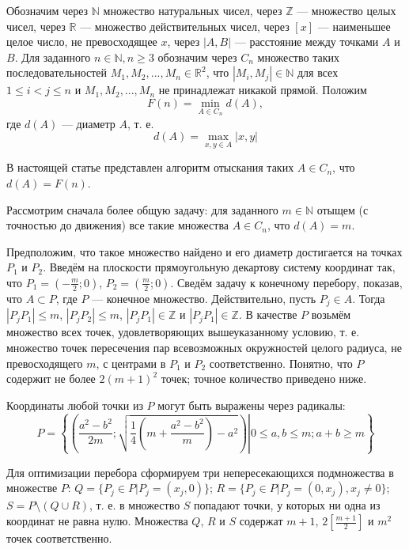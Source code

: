 \documentclass{article}
\begin{document}
Обозначим через $\mathbb{N}$ множество натуральных чисел, через $\mathbb{Z}$ --- множество целых чисел, через $\mathbb{R}$ --- множество действительных чисел, через $[x]$ --- наименьшее целое число, не превосходящее $x$, через $|A,B|$ --- расстояние между точками $A$ и $B$.
Для заданного $n\in \mathbb{N}, n\geq 3$ обозначим через $C_n$ множество таких последовательностей $M_1,M_2,...,M_n \in \mathbb{R}^2$, что $|M_i,M_j|\in\mathbb{N}$ для всех $1\leq i < j  \leq n$ и  $M_1,M_2,...,M_n$ не принадлежат никакой прямой.
Положим
$$
F(n)=\min\limits_{A\in C_n} d(A),
$$
где $d(A)$ --- диаметр $A$, т. е.
$$
d(A)=\max\limits_{x,y\in A}|x,y|
$$

В настоящей статье представлен алгоритм отыскания таких $A \in C_n$, что $d(A) = F(n)$.






Рассмотрим сначала более общую задачу: для заданного $m \in \mathbb{N}$ отыщем (с точностью до движения) все такие множества $A \in C_n$, что $d(A) = m$.

Предположим, что такое множество найдено и его диаметр достигается на точках $P_1$ и $P_2$.
Введём на плоскости прямоугольную декартову систему координат так, что $P_1 = \left(-\frac{m}{2}; 0 \right)$, $P_2 = \left(\frac{m}{2}; 0\right)$.
Сведём задачу к конечному перебору, показав, что $A \subset P$, где $P$ --- конечное множество.
Действительно, пусть $P_{j} \in A$.
Тогда $|P_{j} P_1| \leq m$, $|P_{j} P_2| \leq m$, $|P_{j} P_1| \in \mathbb{Z}$ и $|P_{j} P_1| \in \mathbb{Z}$.
В качестве $P$ возьмём множество всех точек, удовлетворяющих вышеуказанному условию, т. е. множество точек пересечения пар всевозможных окружностей целого радиуса, не превосходящего $m$, с центрами в $P_1$ и $P_2$ соответственно.
Понятно, что $P$ содержит не более $2(m+1)^2$ точек; точное количество приведено ниже.

Координаты любой точки из $P$ могут быть выражены через радикалы:
$$
	P = \left\{
		\left(\left.  \frac{a^2-b^2}{2m} ; \sqrt{ \frac{1}{4} \left(m+\frac{a^2-b^2}{m} \right) - a^2 }  \right)	\right| 0 \leq a, b \leq m ; a+b \geq m
	\right\}
$$


Для оптимизации перебора сформируем три непересекающихся подмножества в множестве $P$:
$Q = \{P_j \in P | P_j = (x_j, 0)\}$;
$R = \{P_j \in P | P_j = (0, x_j), x_j \neq 0\}$;
$S = P \setminus \left( Q \cup R\right)$,
т. е. в множество $S$ попадают точки, у которых ни одна из координат не равна нулю.
Множества $Q$, $R$ и $S$ содержат $m+1$, $2\left\lbrack\frac{m+1}{2}\right\rbrack$ и $m^2$ точек соответственно.
\end{document}

